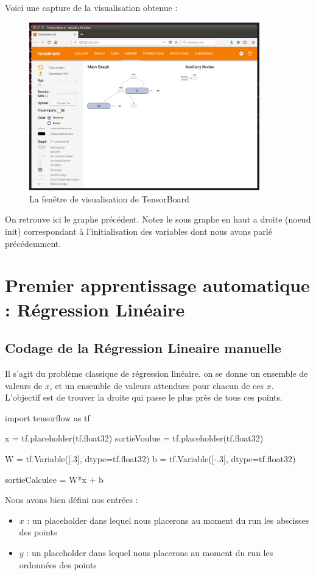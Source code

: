 \documentclass[a4paper,11pt]{book}
\begin{document}
Voici une capture de la visualisation obtenue :
\begin{figure}[H]

\begin{center}
\includegraphics[width=10cm]{./figures/premierTensorBoard.png} 
\end{center}
\caption{La fenêtre de visualisation de TensorBoard}
\end{figure}

On retrouve ici le graphe précédent. Notez le sous graphe en haut a droite (noeud init) correspondant à l'initialisation des variables dont nous avons parlé précédemment. 

\chapter{Premier apprentissage automatique : Régression Linéaire}

\section{Codage de la Régression Lineaire manuelle}
Il s'agit du problème classique de régression linéaire. on se donne un ensemble de valeurs de $x$, et un ensemble de valeurs attendues pour chacun de ces $x$. L'objectif est de trouver la droite qui passe le plus près de tous ces points.
\begin{mypython}
import tensorflow as tf

x = tf.placeholder(tf.float32)
sortieVoulue = tf.placeholder(tf.float32)

W = tf.Variable([.3], dtype=tf.float32)
b = tf.Variable([-.3], dtype=tf.float32)

sortieCalculee = W*x + b
\end{mypython}
Nous avons bien défini nos entrées :
\begin{itemize}
\item $x$ : un placeholder dans lequel nous placerons au moment du run les abscisses des points
\item $y$ : un placeholder dans lequel nous placerons au moment du run les ordonnées des points
\end{itemize}
\end{document}
